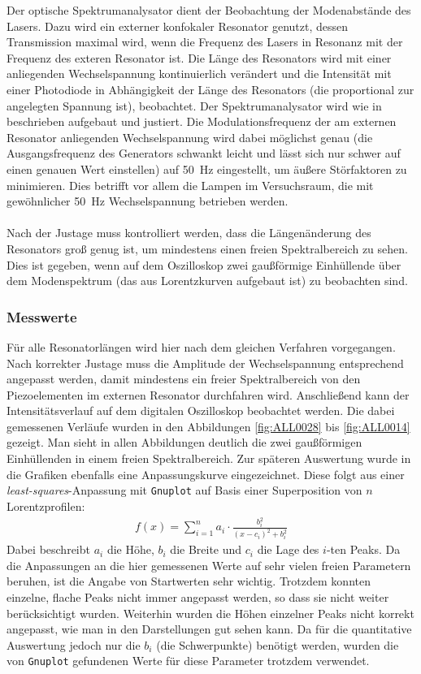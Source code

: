\documentclass[11pt, a4paper]{article}
\numberwithin{equation}{section}
\begin{document}
Der optische Spektrumanalysator dient der Beobachtung der Modenabstände des Lasers.
Dazu wird ein externer konfokaler Resonator genutzt, dessen Transmission maximal wird, wenn die Frequenz des Lasers in Resonanz mit der Frequenz des exteren Resonator ist.
Die Länge des Resonators wird mit einer anliegenden Wechselspannung kontinuierlich verändert und die Intensität mit einer Photodiode in Abhängigkeit der Länge des Resonators (die proportional zur angelegten Spannung ist), beobachtet.
Der Spektrumanalysator wird wie in \cite{anleitung} beschrieben aufgebaut und justiert.
Die Modulationsfrequenz der am externen Resonator anliegenden Wechselspannung wird dabei möglichst genau (die Ausgangsfrequenz des Generators schwankt leicht und lässt sich nur schwer auf einen genauen Wert einstellen) auf \SI{50}{\hertz} eingestellt, um äußere Störfaktoren zu minimieren.
Dies betrifft vor allem die Lampen im Versuchsraum, die mit gewöhnlicher \SI{50}{\hertz} Wechselspannung betrieben werden.\\
\\
Nach der Justage muss kontrolliert werden, dass die Längenänderung des Resonators groß genug ist, um mindestens einen freien Spektralbereich zu sehen.
Dies ist gegeben, wenn auf dem Oszilloskop zwei gaußförmige Einhüllende über dem Modenspektrum (das aus Lorentzkurven aufgebaut ist) zu beobachten sind.

\subsubsection{Messwerte}

Für alle Resonatorlängen wird hier nach dem gleichen Verfahren vorgegangen.
Nach korrekter Justage muss die Amplitude der Wechselspannung entsprechend angepasst werden, damit mindestens ein freier Spektralbereich von den Piezoelementen im externen Resonator durchfahren wird.
Anschließend kann der Intensitätsverlauf auf dem digitalen Oszilloskop beobachtet werden.
Die dabei gemessenen Verläufe wurden in den Abbildungen \ref{fig:ALL0028} bis \ref{fig:ALL0014} gezeigt.
Man sieht in allen Abbildungen deutlich die zwei gaußförmigen Einhüllenden in einem freien Spektralbereich.
Zur späteren Auswertung wurde in die Grafiken ebenfalls eine Anpassungskurve eingezeichnet.
Diese folgt aus einer \emph{least-squares}-Anpassung mit \texttt{Gnuplot} auf Basis einer Superposition von $n$ Lorentzprofilen:
\begin{align}
f(x)=\sum_{i=1}^{n}a_i\cdot\frac{b_i^2}{(x-c_i)^2+b_i^2}
\end{align}
Dabei beschreibt $a_i$ die Höhe, $b_i$ die Breite und $c_i$ die Lage des $i$-ten Peaks.
Da die Anpassungen an die hier gemessenen Werte auf sehr vielen freien Parametern beruhen, ist die Angabe von Startwerten sehr wichtig.
Trotzdem konnten einzelne, flache Peaks nicht immer angepasst werden, so dass sie nicht weiter berücksichtigt wurden.
Weiterhin wurden die Höhen einzelner Peaks nicht korrekt angepasst, wie man in den Darstellungen gut sehen kann.
Da für die quantitative Auswertung jedoch nur die $b_i$ (die Schwerpunkte) benötigt werden, wurden die von \texttt{Gnuplot} gefundenen Werte für diese Parameter trotzdem verwendet.
\end{document}
